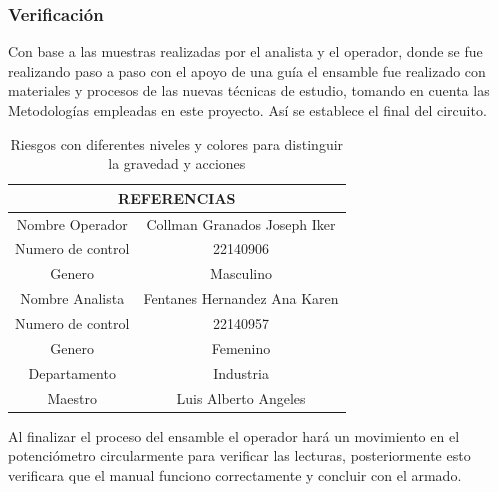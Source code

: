     \subsubsection{Verificación}
    Con base a las muestras realizadas por el analista y el operador, donde se fue realizando paso a paso con el apoyo de una guía el ensamble fue realizado con materiales y procesos de las nuevas técnicas de estudio, tomando en cuenta las Metodologías empleadas en este proyecto. Así se establece el final del circuito.
    \begin{table}[h]
        \centering
        \caption{Riesgos con diferentes niveles y colores para distinguir la gravedad y acciones}
        \begin{tabular}{|c| c|}
        \hline
        \multicolumn{2}{c}{REFERENCIAS}\\
        \hline
             Nombre Operador & Collman Granados Joseph Iker  \\
        \hline
             Numero de control& 22140906  \\
        \hline
              Genero & Masculino \\
        \hline
             Nombre Analista& Fentanes Hernandez Ana Karen\\
        \hline
              Numero de control & 22140957\\
        \hline
            Genero & Femenino\\   
        \hline 
            Departamento & Industria\\
        \hline
            Maestro&  Luis Alberto Angeles\\
        \end{tabular}
        \label{tab:INFORMACION GENERAL}
    \end{table}
    Al finalizar el proceso del ensamble el operador   hará un movimiento en el potenciómetro circularmente para verificar las lecturas,  posteriormente esto verificara que el manual funciono correctamente y concluir con el armado.  
